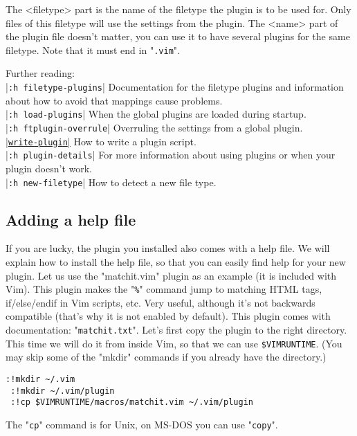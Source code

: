 The <filetype> part is the name of the filetype the plugin is to be used for.
Only files of this filetype will use the settings from the plugin.
The <name> part of the plugin file doesn't matter, you can use it to have several plugins for the same filetype.
Note that it must end in "\verb!.vim!".

Further reading:\\ %
|\verb!:h filetype-plugins!| Documentation for the filetype plugins and information about how to avoid that mappings cause problems.\\
|\verb!:h load-plugins!|     When the global plugins are loaded during startup.\\
|\verb!:h ftplugin-overrule!|   Overruling the settings from a global plugin.\\
\hyperref[write-plugin]{|\texttt{write-plugin}|}       How to write a plugin script.\\
|\verb!:h plugin-details!| For more information about using plugins or when your plugin doesn't work.\\
|\verb!:h new-filetype!|     How to detect a new file type.

\subsection{Adding a help file}
\label{add-local-help}
\label{matchit-install}

If you are lucky, the plugin you installed also comes with a help file.
We will explain how to install the help file, so that you can easily find help for your new plugin.
Let us use the "matchit.vim" plugin as an example (it is included with Vim).
This plugin makes the "\verb!%!" command jump to matching HTML tags, if/else/endif in Vim scripts, etc.
Very useful, although it's not backwards compatible (that's why it is not enabled by default).
This plugin comes with documentation: "\verb!matchit.txt!".
Let's first copy the plugin to the right directory.
This time we will do it from inside Vim, so that we can use \verb!$VIMRUNTIME!.
(You may skip some of the "mkdir" commands if you already have the directory.)

 \begin{Verbatim}[samepage=true]
 :!mkdir ~/.vim
 :!mkdir ~/.vim/plugin
 :!cp $VIMRUNTIME/macros/matchit.vim ~/.vim/plugin
 \end{Verbatim}

The "\verb!cp!" command is for Unix, on MS-DOS you can use "\verb!copy!".


